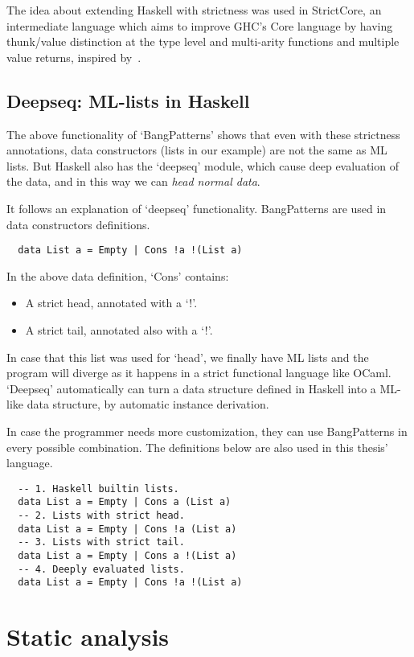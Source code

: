 \documentclass[diploma]{softlab-thesis}
\begin{document}
The idea about extending Haskell with strictness was used in StrictCore, an intermediate language 
which aims to improve GHC's Core language by having
thunk/value distinction at the type level and multi-arity functions and multiple value returns, 
inspired by~\cite{Bol09}.


\subsection{Deepseq: ML-lists in Haskell}
\label{sec:deepseq}

The above functionality of `BangPatterns' shows that even with these strictness annotations, data constructors (lists in our
example) are not the same as ML lists. But Haskell also has the `deepseq' module, which cause deep evaluation of the data, 
and in this way we can \textit{head normal data}. 

It follows an explanation of `deepseq' functionality. 
BangPatterns are used in data constructors definitions.

\begin{verbatim}
  data List a = Empty | Cons !a !(List a)
\end{verbatim}

In the above data definition, `Cons' contains:
\begin{itemize}
  \item A strict head, annotated with a `!'.
  \item A strict tail, annotated also with a `!'.
\end{itemize}

In case that this list was used for `head', we finally have ML lists and the program 
will diverge as it happens in a strict functional language like OCaml. `Deepseq' automatically can turn a data structure
defined in Haskell into a ML-like data structure, by automatic instance derivation.

In case the programmer needs more customization, they can use BangPatterns in every possible combination. 
The definitions below are also used in this thesis' language.
\begin{verbatim}
  -- 1. Haskell builtin lists.
  data List a = Empty | Cons a (List a) 
  -- 2. Lists with strict head.
  data List a = Empty | Cons !a (List a)
  -- 3. Lists with strict tail.
  data List a = Empty | Cons a !(List a)
  -- 4. Deeply evaluated lists. 
  data List a = Empty | Cons !a !(List a)
\end{verbatim}

\section {Static analysis}
\label{sec:static-analysis}
\end{document}
